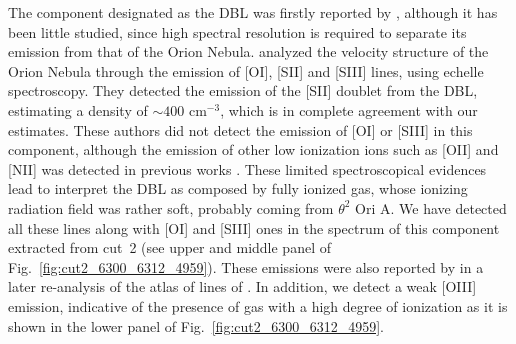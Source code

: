 \documentclass[twocolumn,linenumbers]{aastex63}
\begin{document}
The component designated as the DBL was firstly reported by \citet{Deharveng73}, although it has been little studied, since high spectral resolution is required to separate its emission from that of the Orion Nebula. \citet{garciadiaz07} analyzed the velocity structure of the Orion Nebula through the emission of [O\thinspace I], [S\thinspace II] and [S\thinspace III] lines, using echelle spectroscopy. They detected the emission of the [S\thinspace II] doublet from the DBL, estimating a density of $\sim 400 \text{ cm}^{-3}$, which is in complete agreement with our estimates. These authors did not detect the emission of [O\thinspace I] or [S\thinspace III] in this component, although the emission of other low ionization ions such as [O\thinspace II] and [N\thinspace II] was detected in previous works \citep{Jones92,henneyodell99}. These limited  spectroscopical evidences lead to interpret the DBL as composed by fully ionized gas, whose ionizing radiation field was rather soft, probably coming from $\theta^{2} \text{ Ori A}$. We have detected all these lines along with [O\thinspace I] and [S\thinspace III] ones in the spectrum of this component extracted from cut~2 (see upper and middle panel of Fig.~\ref{fig:cut2_6300_6312_4959}). These emissions were also reported by \citet{odell18} in a later re-analysis of the atlas of lines of \citet[][]{garciadiaz07}. In addition, we detect a weak [O\thinspace III] emission, indicative of the presence of gas with a high degree of ionization as it is shown in the lower panel of Fig.~\ref{fig:cut2_6300_6312_4959}. 
\end{document}

